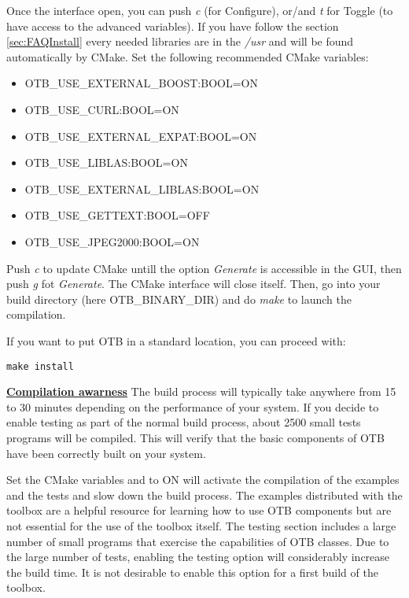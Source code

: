 Once the interface open, you can push \emph{c} (for Configure), or/and \emph{t} for Toggle (to have access to the advanced variables). If you have follow the section \ref{sec:FAQInstall} every needed libraries are in the
\emph{/usr} and will be found automatically by CMake. Set the following recommended CMake variables:
\begin{itemize}
\item OTB\_USE\_EXTERNAL\_BOOST:BOOL=ON
\item OTB\_USE\_CURL:BOOL=ON
\item OTB\_USE\_EXTERNAL\_EXPAT:BOOL=ON
\item OTB\_USE\_LIBLAS:BOOL=ON
\item OTB\_USE\_EXTERNAL\_LIBLAS:BOOL=ON
\item OTB\_USE\_GETTEXT:BOOL=OFF
\item OTB\_USE\_JPEG2000:BOOL=ON
\end{itemize}

Push \emph{c} to update CMake untill the option \emph{Generate} is accessible in the GUI,
then push \emph{g} fot \emph{Generate}. The CMake interface will close itself.
Then, go into your build directory (here OTB\_BINARY\_DIR) and do \emph{make} to launch the compilation.

If you want to put OTB in a standard location, you can proceed with:

\begin{verbatim}
make install
\end{verbatim}

\textbf{\underline{Compilation awarness}}
The build process will typically take anywhere from 15 to 30 minutes depending
on the performance of your system. If you decide to enable testing as part of
the normal build process, about 2500 small tests programs will be compiled. This
will verify that the basic components of OTB have been correctly built on your
system.

Set the CMake variables  and  to ON will activate 
the compilation of the examples and the tests and slow down the build process.
The examples distributed with the toolbox are a helpful resource for learning how to use OTB
components but are not essential for the use of the toolbox itself. The testing
section includes a large number of small programs that exercise the
capabilities of OTB classes. Due to the large number of tests, enabling the
testing option will considerably increase the build time.  It is not
desirable to enable this option for a first build of the toolbox.

